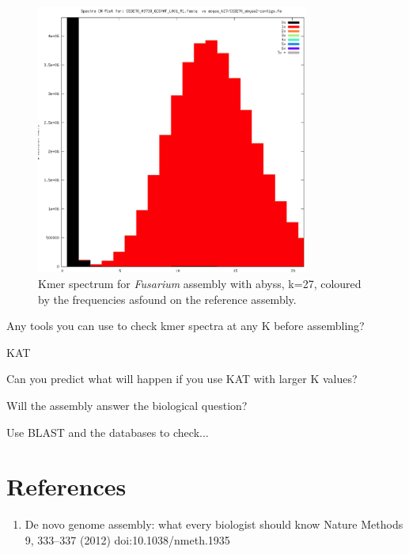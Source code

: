 \begin{figure}[H]
\centering
\includegraphics[width=0.8\textwidth]{handout/abyss-k27.png}
\caption{Kmer spectrum for \textit{Fusarium} assembly with abyss, k=27, coloured by the frequencies asfound on the reference assembly.}
\label{fig:fusariumk27}
\end{figure}

\begin{questions}
Any tools you can use to check kmer spectra at any K before assembling? \\
\begin{answer}
KAT \\
\end{answer}
Can you predict what will happen if you use KAT with larger K values? \\
\begin{answer}
\end{answer}
\end{questions}

\begin{steps}
Will the assembly answer the biological question?

Use BLAST and the databases to check...
\end{steps}

\section{References}
\begin{enumerate}
  \item De novo genome assembly: what every biologist should know Nature Methods 9, 333–337 (2012) doi:10.1038/nmeth.1935 
\end{enumerate}
